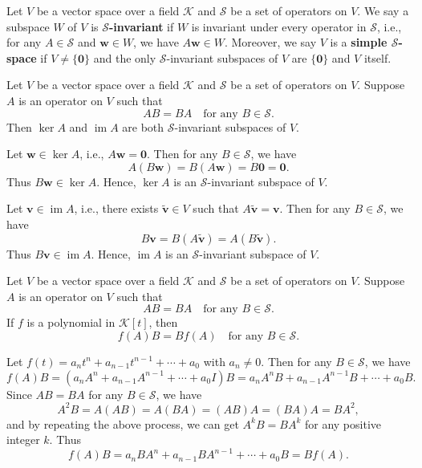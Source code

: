 \begin{definitionenv}
    Let $V$ be a vector space over a field $\mathcal K$ and $\mathcal S$ be a set of operators on $V$. We say a subspace $W$ of $V$ is \textbf{$\mathcal S$-invariant} if $W$ is invariant under every operator in $\mathcal S$, i.e., for any $A\in \mathcal S$ and $\bm w \in W$, we have $A \bm w \in W$. Moreover, we say $V$ is a \textbf{simple $\mathcal S$-space} if $V\ne \{ \bm 0 \}$ and the only $\mathcal S$-invariant subspaces of $V$ are $\{ \bm 0 \}$ and $V$ itself.
\end{definitionenv}
\begin{propositionenv}\label{prop:kernel-and-image-invariant-subspaces}
    Let $V$ be a vector space over a field $\mathcal K$ and $\mathcal S$ be a set of operators on $V$. Suppose $A$ is an operator on $V$ such that
    $$ AB = BA \quad \text{for any } B \in \mathcal S. $$
    Then $\ker A$ and $\operatorname{im} A$ are both $\mathcal S$-invariant subspaces of $V$.
\end{propositionenv}
\begin{proofenv}
    Let $\bm w \in \ker A$, i.e., $A \bm w = \bm 0$. Then for any $B \in \mathcal S$, we have
    $$ A (B \bm w) = B (A \bm w) = B \bm 0 = \bm 0. $$
    Thus $B \bm w \in \ker A$. Hence, $\ker A$ is an $\mathcal S$-invariant subspace of $V$.
    
    Let $\bm v \in \operatorname{im} A$, i.e., there exists $\widetilde{\bm v} \in V$ such that $A \widetilde{\bm v} = \bm v$. Then for any $B\in \mathcal S$, we have
    $$ B \bm v = B (A \widetilde{\bm v}) = A (B \widetilde{\bm v}). $$
    Thus $B\bm v \in \operatorname{im} A$. Hence, $\operatorname{im} A$ is an $\mathcal S$-invariant subspace of $V$.
\end{proofenv}
\begin{propositionenv}
    Let $V$ be a vector space over a field $\mathcal K$ and $\mathcal S$ be a set of operators on $V$. Suppose $A$ is an operator on $V$ such that
    $$ AB = BA \quad \text{for any } B \in \mathcal S. $$
    If $f$ is a polynomial in $\mathcal K[t]$, then
    $$ f(A) B = B f(A) \quad \text{for any } B \in \mathcal S. $$
\end{propositionenv}
\begin{proofenv}
    Let $f(t) = a_n t^n + a_{n-1} t^{n-1} + \cdots + a_0$ with $a_n \ne 0$. Then for any $B \in \mathcal S$, we have
    $$ f(A) B = (a_n A^n + a_{n-1} A^{n-1} + \cdots + a_0 I) B = a_n A^n B + a_{n-1} A^{n-1} B + \cdots + a_0 B. $$
    Since $AB = BA$ for any $B \in \mathcal S$, we have
    $$ A^2 B = A (A B) = A (B A) = (A B) A = (B A) A = B A^2, $$
    and by repeating the above process, we can get $A^k B = B A^k$ for any positive integer $k$. Thus
    $$ f(A) B = a_n B A^n + a_{n-1} B A^{n-1} + \cdots + a_0 B = B f(A). $$
\end{proofenv}
